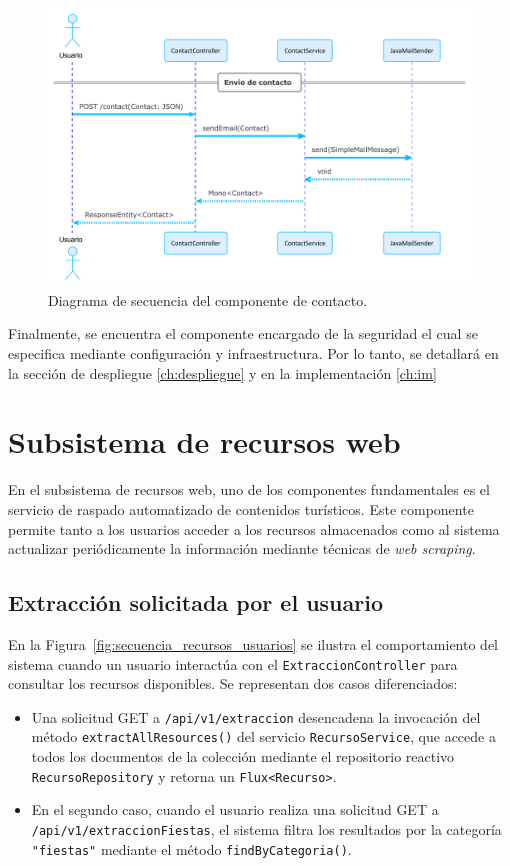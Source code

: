\begin{figure}[h!tb]
    \centering
    \includegraphics[width=\textwidth]{figs/secuencia_contacto.pdf}
    \caption{Diagrama de secuencia del componente de contacto.\label{fig:secuencia_contacto}}
\end{figure}

Finalmente, se encuentra el componente encargado de la seguridad el cual se especifica mediante configuración y infraestructura. Por lo tanto, se detallará en la sección de despliegue \ref{ch:despliegue} y en la implementación \ref{ch:im}
\section{Subsistema de recursos web}

En el subsistema de recursos web, uno de los componentes fundamentales es el servicio de raspado automatizado de contenidos turísticos. Este componente permite tanto a los usuarios acceder a los recursos almacenados como al sistema actualizar periódicamente la información mediante técnicas de \textit{web scraping}.

\subsection{Extracción solicitada por el usuario}

En la Figura~\ref{fig:secuencia_recursos_usuarios} se ilustra el comportamiento del sistema cuando un usuario interactúa con el \texttt{ExtraccionController} para consultar los recursos disponibles. Se representan dos casos diferenciados:

\begin{itemize}
  \item Una solicitud GET a \texttt{/api/v1/extraccion} desencadena la invocación del método \texttt{extractAllResources()} del servicio \texttt{RecursoService}, que accede a todos los documentos de la colección mediante el repositorio reactivo \texttt{RecursoRepository} y retorna un \texttt{Flux<Recurso>}.
  
  \item En el segundo caso, cuando el usuario realiza una solicitud GET a \texttt{/api/v1/extraccionFiestas}, el sistema filtra los resultados por la categoría \texttt{"fiestas"} mediante el método \texttt{findByCategoria()}.
\end{itemize}

